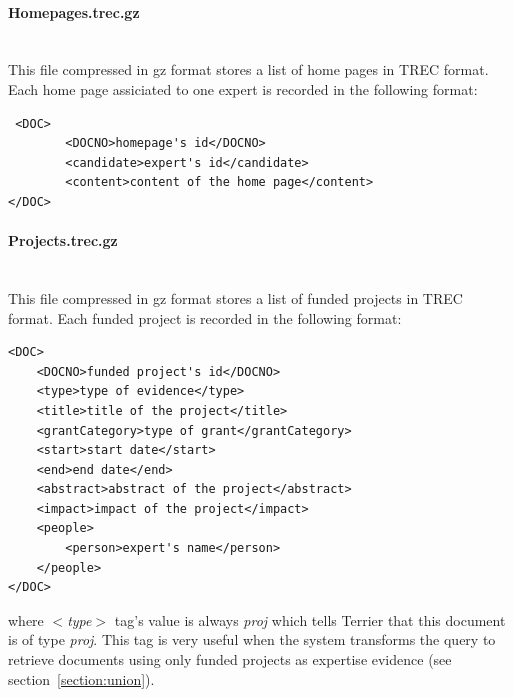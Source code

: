 \paragraph{Homepages.trec.gz} \hspace{0pt} \\
This file compressed in gz format stores a list of home pages in TREC format. Each home page assiciated to one expert is recorded in the following format:
\begin{verbatim}
 <DOC>
        <DOCNO>homepage's id</DOCNO>
        <candidate>expert's id</candidate>
        <content>content of the home page</content>
</DOC>
\end{verbatim}


\paragraph{Projects.trec.gz} \hspace{0pt} \\
This file compressed in gz format stores a list of funded projects in TREC format. Each funded project is recorded in the following format:
\begin{verbatim}
<DOC>
	<DOCNO>funded project's id</DOCNO>
	<type>type of evidence</type>
	<title>title of the project</title>
	<grantCategory>type of grant</grantCategory>
	<start>start date</start>
	<end>end date</end>
	<abstract>abstract of the project</abstract>
	<impact>impact of the project</impact>
	<people>
		<person>expert's name</person>
	</people>
</DOC>

\end{verbatim}
where \textit{$<$type$>$} tag's value is always \textit{proj} which tells Terrier that this document is of type \textit{proj}. This tag is very useful when 
the system transforms the query to retrieve documents using only funded projects as expertise evidence (see section~\ref{section:union}).

